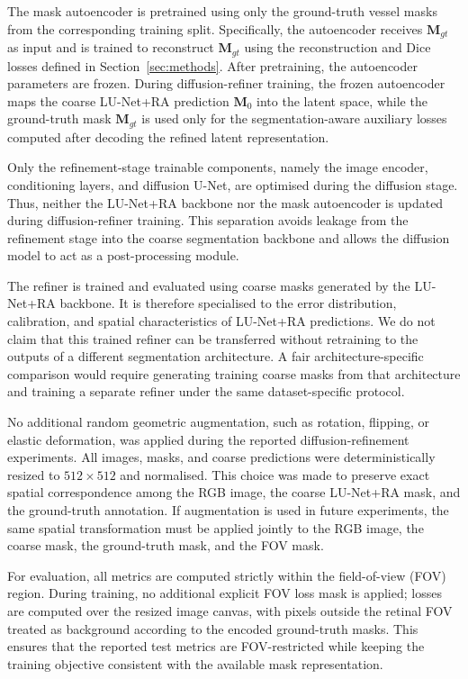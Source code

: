 \documentclass[journal,article,submit,pdftex,moreauthors]{Definitions/mdpi}
\begin{document}
The mask autoencoder is pretrained using only the ground-truth vessel masks from the corresponding training split. Specifically, the autoencoder receives $\mathbf{M}_{gt}$ as input and is trained to reconstruct $\mathbf{M}_{gt}$ using the reconstruction and Dice losses defined in Section~\ref{sec:methods}. After pretraining, the autoencoder parameters are frozen. During diffusion-refiner training, the frozen autoencoder maps the coarse LU-Net+RA prediction $\mathbf{M}_0$ into the latent space, while the ground-truth mask $\mathbf{M}_{gt}$ is used only for the segmentation-aware auxiliary losses computed after decoding the refined latent representation.

Only the refinement-stage trainable components, namely the image encoder, conditioning layers, and diffusion U-Net, are optimised during the diffusion stage. Thus, neither the LU-Net+RA backbone nor the mask autoencoder is updated during diffusion-refiner training. This separation avoids leakage from the refinement stage into the coarse segmentation backbone and allows the diffusion model to act as a post-processing module.

The refiner is trained and evaluated using coarse masks generated by the LU-Net+RA backbone. It is therefore specialised to the error distribution, calibration, and spatial characteristics of LU-Net+RA predictions. We do not claim that this trained refiner can be transferred without retraining to the outputs of a different segmentation architecture. A fair architecture-specific comparison would require generating training coarse masks from that architecture and training a separate refiner under the same dataset-specific protocol.

No additional random geometric augmentation, such as rotation, flipping, or elastic deformation, was applied during the reported diffusion-refinement experiments. All images, masks, and coarse predictions were deterministically resized to $512\times512$ and normalised. This choice was made to preserve exact spatial correspondence among the RGB image, the coarse LU-Net+RA mask, and the ground-truth annotation. If augmentation is used in future experiments, the same spatial transformation must be applied jointly to the RGB image, the coarse mask, the ground-truth mask, and the FOV mask.

For evaluation, all metrics are computed strictly within the field-of-view (FOV) region. During training, no additional explicit FOV loss mask is applied; losses are computed over the resized image canvas, with pixels outside the retinal FOV treated as background according to the encoded ground-truth masks. This ensures that the reported test metrics are FOV-restricted while keeping the training objective consistent with the available mask representation.
\end{document}
